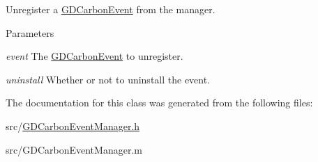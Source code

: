 Unregister a \hyperlink{interface_g_d_carbon_event}{GDCarbonEvent} from the manager. 
\begin{DoxyParams}{Parameters}
\item[{\em event}]The \hyperlink{interface_g_d_carbon_event}{GDCarbonEvent} to unregister. \item[{\em uninstall}]Whether or not to uninstall the event. \end{DoxyParams}


The documentation for this class was generated from the following files:\begin{DoxyCompactItemize}
\item 
src/\hyperlink{_g_d_carbon_event_manager_8h}{GDCarbonEventManager.h}\item 
src/GDCarbonEventManager.m\end{DoxyCompactItemize}
